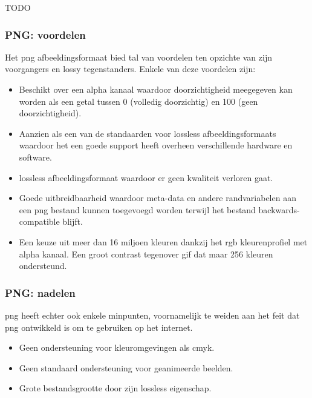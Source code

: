 TODO


\subsubsection{PNG: voordelen}
\label{sec:afbeeldingscompressie-png-voordelen}

Het \gls{png} \gls{afbeeldingsformaat} bied tal van voordelen ten opzichte van zijn voorgangers en \gls{lossy} tegenstanders. Enkele van deze voordelen zijn:

\begin{itemize}
	\item Beschikt over een alpha kanaal waardoor doorzichtigheid meegegeven kan worden als een getal tussen 0 (volledig doorzichtig) en 100 (geen doorzichtigheid).
	
	\item Aanzien als een van de standaarden voor \gls{lossless} \glspl{afbeeldingsformaat} waardoor het een goede support heeft overheen verschillende hardware en software.
	
	\item \Gls{lossless} \gls{afbeeldingsformaat} waardoor er geen kwaliteit verloren gaat.
	
	\item Goede uitbreidbaarheid waardoor \gls{meta-data} en andere randvariabelen aan een \gls{png} bestand kunnen toegevoegd worden terwijl het bestand  \gls{backwards-compatible} blijft.
	
	\item Een keuze uit meer dan 16 miljoen kleuren dankzij het \gls{rgb} kleurenprofiel met alpha kanaal. Een groot contrast tegenover \gls{gif} dat maar 256 kleuren ondersteund. 
\end{itemize}

\subsubsection{PNG: nadelen}
\label{sec:afbeeldingscompressie-png-nadelen}

\Gls{png} heeft echter ook enkele minpunten, voornamelijk te weiden aan het feit dat \gls{png} ontwikkeld is om te gebruiken op het internet.

\begin{itemize}
	\item Geen ondersteuning voor kleuromgevingen als \gls{cmyk}.
	
	\item Geen standaard ondersteuning voor geanimeerde beelden.
	
	\item Grote bestandsgrootte door zijn \gls{lossless} eigenschap.
\end{itemize}

